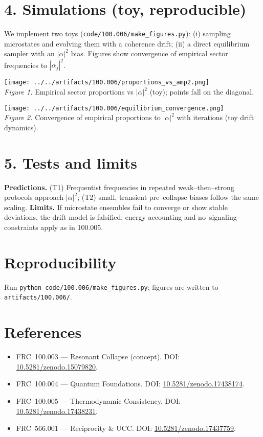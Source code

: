 \documentclass[10pt]{article}
\begin{document}
\section*{4. Simulations (toy, reproducible)}
We implement two toys (\verb|code/100.006/make_figures.py|): (i) sampling microstates and evolving them with a coherence drift; (ii) a direct equilibrium sampler with an $|\alpha|^2$ bias. Figures show convergence of empirical sector frequencies to $|\alpha_j|^2$.

\begin{center}
\texttt{[image: ../../artifacts/100.006/proportions\_vs\_amp2.png]}\\
\emph{Figure 1.} Empirical sector proportions vs $|\alpha|^2$ (toy); points fall on the diagonal.
\end{center}

\begin{center}
\texttt{[image: ../../artifacts/100.006/equilibrium\_convergence.png]}\\
\emph{Figure 2.} Convergence of empirical proportions to $|\alpha|^2$ with iterations (toy drift dynamics).
\end{center}

\section*{5. Tests and limits}
\textbf{Predictions.} (T1) Frequentist frequencies in repeated weak--then--strong protocols approach $|\alpha|^2$; (T2) small, transient pre--collapse biases follow the same scaling.\newline
\textbf{Limits.} If microstate ensembles fail to converge or show stable deviations, the drift model is falsified; energy accounting and no--signaling constraints apply as in 100.005.

\section*{Reproducibility}
Run \verb|python code/100.006/make_figures.py|; figures are written to \verb|artifacts/100.006/|.

\section*{References}
\small
\begin{itemize}
  \item FRC~100.003 — Resonant Collapse (concept). DOI: \href{https://doi.org/10.5281/zenodo.15079820}{10.5281/zenodo.15079820}.
  \item FRC~100.004 — Quantum Foundations. DOI: \href{https://doi.org/10.5281/zenodo.17438174}{10.5281/zenodo.17438174}.
  \item FRC~100.005 — Thermodynamic Consistency. DOI: \href{https://doi.org/10.5281/zenodo.17438231}{10.5281/zenodo.17438231}.
  \item FRC~566.001 — Reciprocity \& UCC. DOI: \href{https://doi.org/10.5281/zenodo.17437759}{10.5281/zenodo.17437759}.
\end{itemize}
\end{document}
